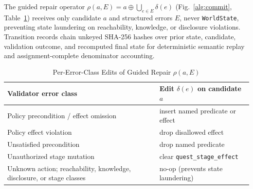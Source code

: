 The guided repair operator $\rho(a,E)=a\oplus\bigcup_{e\in E}\delta(e)$ (Fig.~\ref{alg:commit}, Table~\ref{tab:rho-rules}) receives only candidate $a$ and structured errors $E$, never \texttt{WorldState}, preventing state laundering on reachability, knowledge, or disclosure violations. Transition records chain unkeyed SHA-256 hashes over prior state, candidate, validation outcome, and recomputed final state for deterministic semantic replay and assignment-complete denominator accounting.

\begin{table}[!tbp]
\caption{Per-Error-Class Edits of Guided Repair $\rho(a,E)$}
\label{tab:rho-rules}
\centering
\footnotesize
\begin{tabularx}{\columnwidth}{@{}>{\raggedright\arraybackslash}X>{\raggedright\arraybackslash}X@{}}
\toprule
\textbf{Validator error class} & \textbf{Edit $\delta(e)$ on candidate $a$} \\
\midrule
Policy precondition / effect omission & insert named predicate or effect \\
Policy effect violation & drop disallowed effect \\
Unsatisfied precondition & drop named predicate \\
Unauthorized stage mutation & clear \texttt{quest\_stage\_effect} \\
Unknown action; reachability, knowledge, disclosure, or stage classes & no-op (prevents state laundering) \\
\bottomrule
\end{tabularx}
\end{table}
